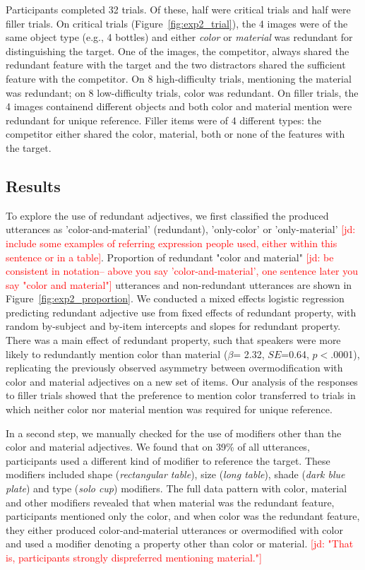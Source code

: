\documentclass[12pt,letterpaper]{article}
\newcommand{\jd}[1]{\textcolor{Red}{[jd: #1]}}
\begin{document}
Participants completed 32 trials. Of these, half were critical trials and half were filler trials. On critical trials (Figure~\ref{fig:exp2_trial}), the 4 images were of the same object type (e.g., 4 bottles) and either \textit{color} or \textit{material} was redundant for distinguishing the target. One of the images, the competitor, always shared the redundant feature with the target and the two distractors shared the sufficient feature with the competitor. On 8 high-difficulty trials, mentioning the material was redundant; on 8 low-difficulty trials, color was redundant. On filler trials, the 4 images containend different objects and both color and material mention were redundant for unique reference. Filler items were of 4 different types: the competitor either shared the color, material, both or none of the features with the target. 

\subsection{Results}

To explore the use of redundant adjectives, we first classified the produced utterances as 'color-and-material' (redundant), 'only-color' or 'only-material' \jd{include some examples of referring expression people used, either within this sentence or in a table}. Proportion of redundant "color and material" \jd{be consistent in notation-- above you say 'color-and-material', one sentence later you say "color and material"} utterances and non-redundant utterances are shown in Figure~\ref{fig:exp2_proportion}. We conducted a mixed effects logistic regression predicting redundant adjective use from fixed effects of redundant property, with random by-subject and by-item intercepts and slopes for redundant property. There was a main effect of redundant property, such that speakers were more likely to redundantly mention color than material ($\beta$= 2.32, $SE$=0.64, $p$$<$.0001), replicating the previously observed asymmetry between overmodification with color and material adjectives on a new set of items. Our analysis of the responses to filler trials showed that the preference to mention color transferred to trials in which neither color nor material mention was required for unique reference. 

In a second step, we manually checked for the use of modifiers other than the color and material adjectives. We found that on 39\% of all utterances, participants used a different kind of modifier to reference the target. These modifiers included shape (\textit{rectangular table}), size (\textit{long table}), shade (\textit{dark blue plate}) and type (\textit{solo cup}) modifiers. The full data pattern with color, material and other modifiers revealed that when material was the redundant feature, participants mentioned only the color, and when color was the redundant feature, they either produced color-and-material utterances or overmodified with color and used a modifier denoting a property other than color or material. \jd{"That is, participants strongly dispreferred mentioning material."}
\end{document}
